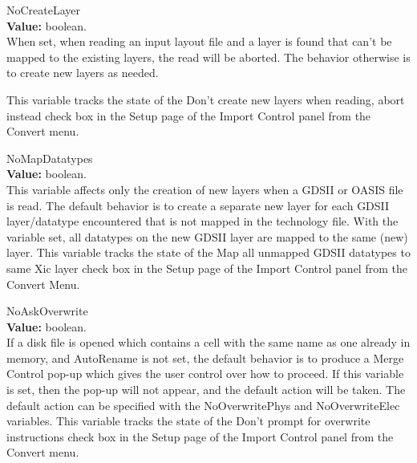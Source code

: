 \begin{description}
\item{\et NoCreateLayer}\\
{\bf Value:} boolean.\\
When set, when reading an input layout file and a layer is found that
can't be mapped to the existing {\Xic} layers, the read will be
aborted.  The behavior otherwise is to create new layers as needed.
 
This variable tracks the state of the {\cb Don't create new layers
when reading, abort instead} check box in the {\cb Setup} page of the
{\cb Import Control} panel from the {\cb Convert menu}.

\item{\et NoMapDatatypes}\\
{\bf Value:} boolean.\\
This variable affects only the creation of new layers when a GDSII or
OASIS file is read.  The default behavior is to create a separate new
{\Xic} layer for each GDSII layer/datatype encountered that is not
mapped in the technology file.  With the variable set, all datatypes
on the new GDSII layer are mapped to the same (new) {\Xic} layer. 
This variable tracks the state of the {\cb Map all unmapped GDSII
datatypes to same Xic layer} check box in the {\cb Setup} page of the
{\cb Import Control} panel from the {\cb Convert Menu}.

\item{\et NoAskOverwrite}\\
{\bf Value:} boolean.\\
If a disk file is opened which contains a cell with the same name as
one already in memory, and {\et AutoRename} is not set, the default
behavior is to produce a {\cb Merge Control} pop-up which gives the
user control over how to proceed.  If this variable is set, then the
pop-up will not appear, and the default action will be taken.  The
default action can be specified with the {\et NoOverwritePhys} and
{\et NoOverwriteElec} variables.  This variable tracks the state of
the {\cb Don't prompt for overwrite instructions} check box in the
{\cb Setup} page of the {\cb Import Control} panel from the {\cb
Convert menu}.


\end{description}
